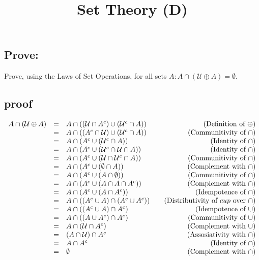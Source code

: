 \documentclass{article}
\title{Set Theory (D)}
\author{}
\date{}
\begin{document}
	\begin{spacing}{1.5}
		\maketitle
		
		\section*{Prove:}
		Prove, using the Laws of Set Operations, for all sets $A: A \cap (\mathcal{U} \oplus A) = \emptyset$.
		
		\subsection*{proof}
		\[\begin{array}{rclr}
			A \cap (\mathcal{U} \oplus A) &=& A \cap ((\mathcal{U} \cap A^{c})\cup(\mathcal{U}^{c}\cap A)) &\quad\text{(Definition of $ \oplus $)}\\
			&=& A \cap ((A^{c}\cap\mathcal{U})\cup(\mathcal{U}^{c}\cap A)) &\quad\text{(Communitivity of $ \cap $)}\\
			&=& A \cap (A^{c}\cup(\mathcal{U}^{c}\cap A)) &\quad\text{(Identity of $ \cap $)}\\
			&=& A \cap (A^{c}\cup(\mathcal{U}^{c}\cap \mathcal{U}\cap A)) &\quad\text{(Identity of $ \cap $)}\\
			&=& A \cap (A^{c}\cup(\mathcal{U}\cap\mathcal{U}^{c} \cap A)) &\quad\text{(Communitivity of $ \cap $)}\\
			&=& A \cap (A^{c}\cup(\emptyset \cap A)) &\quad\text{(Complement with $ \cap $)}\\
			&=& A \cap (A^{c}\cup(A \cap \emptyset)) &\quad\text{(Communitivity of $ \cap $)}\\
			&=& A \cap (A^{c}\cup(A \cap A\cap A^{c})) &\quad\text{(Complement with $ \cap $)}\\
			&=& A \cap (A^{c}\cup(A \cap A^{c})) &\quad\text{(Idempotence of $ \cap $)}\\
			&=& A \cap ((A^{c}\cup A)\cap(A^{c} \cup A^{c})) &\quad\text{(Distributivity of $ cup $ over $ \cap $)}\\
			&=& A \cap ((A^{c}\cup A)\cap A^{c}) &\quad\text{(Idempotence of $ \cup $)}\\
			&=& A \cap ((A \cup A^{c})\cap A^{c}) &\quad\text{(Communitivity of $ \cup $)}\\
			&=& A \cap ( \mathcal{U} \cap A^{c}) &\quad\text{(Complement with $ \cup $)}\\
			&=& (A \cap \mathcal{U}) \cap A^{c} &\quad\text{(Assosiativity with $ \cap $)}\\
			&=& A \cap  A^{c} &\quad\text{(Identity of $ \cap $)}\\
			&=&  \emptyset  &\quad\text{(Complement with $ \cap $)}
		\end{array}\]
		
		
	\end{spacing}
	
	
	
\end{document}
